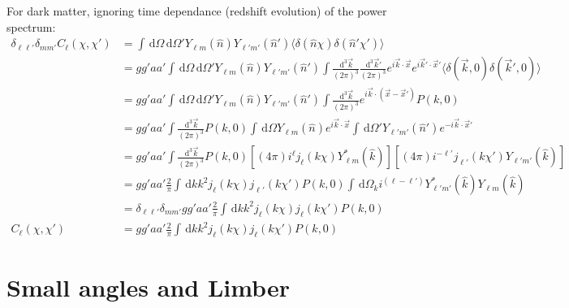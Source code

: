 \documentclass[onecolumn,prd,nofootinbib]{revtex4-1}
\newcommand{\ud}{\,\mathrm{d}}
\begin{document}
For dark matter, ignoring time dependance (redshift evolution)
of the power spectrum:
\begin{align}
\delta_{\ell\ell'}\delta_{mm'}C_\ell(\chi, \chi')
    &= \int\ud\Omega\ud\Omega'Y_{\ell m}(\hat n) Y_{\ell' m'}(\hat n')
        \langle \delta(\hat n \chi) \delta(\hat n' \chi') \rangle
        \\
    &= gg'aa'
        \int\ud\Omega\ud\Omega'Y_{\ell m}(\hat n) Y_{\ell' m'}(\hat n')
        \int\frac{\ud^3\vec k}{(2 \pi)^3} \frac{\ud^3\vec k'}{(2 \pi)^3}
        e^{i\vec k \cdot \vec x} e^{i\vec k' \cdot \vec x'}
        \langle \delta(\vec k, 0) \delta(\vec k', 0) \rangle
        \\
    &= gg'aa'
        \int\ud\Omega\ud\Omega'Y_{\ell m}(\hat n) Y_{\ell' m'}(\hat n')
        \int\frac{\ud^3\vec k}{(2 \pi)^3} 
        e^{i\vec k \cdot (\vec x - \vec x')} P(k, 0)
        \\
    &= gg'aa'
        \int\frac{\ud^3\vec k}{(2 \pi)^3} P(k, 0)
        \int\ud\Omega Y_{\ell m}(\hat n)
        e^{i\vec k \cdot \vec x}
        \int\ud\Omega' Y_{\ell' m'}(\hat n')
        e^{-i\vec k \cdot \vec x'}
        \\
    &= gg'aa'
        \int\frac{\ud^3\vec k}{(2 \pi)^3} P(k, 0)
        \left[(4 \pi) i^\ell j_\ell(k\chi) Y_{\ell m}^*(\hat k)\right]
        \left[(4 \pi) i^{-\ell'} j_{\ell'}(k\chi') Y_{\ell' m'}(\hat
        k)\right]
        \\
    &= gg'aa'\frac{2}{\pi}
        \int\ud k k^2 j_\ell(k\chi) j_{\ell'}(k\chi')P(k, 0)
        \int\ud \Omega_k i^{(\ell - \ell')}
        Y_{\ell' m'}^*(\hat k) Y_{\ell m}(\hat k)
        \\
    &= \delta_{\ell\ell'}\delta_{mm'}gg'aa'\frac{2}{\pi}
        \int\ud k k^2  j_\ell(k\chi) j_{\ell}(k\chi')P(k, 0)
        \\
C_\ell(\chi,\chi') 
    &= gg'aa'\frac{2}{\pi}
        \int\ud k k^2 j_\ell(k\chi) j_{\ell}(k\chi')P(k, 0)
\end{align}

\section{Small angles and Limber}
\end{document}
